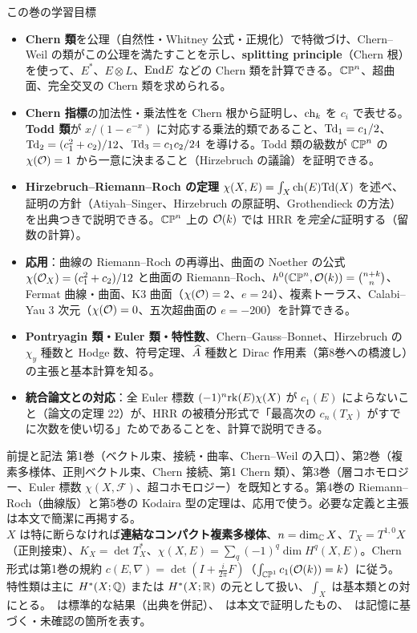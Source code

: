 \begin{goalbox}{この巻の学習目標}
\begin{itemize}
\item \textbf{Chern 類}を公理（自然性・Whitney 公式・正規化）で特徴づけ、Chern--Weil の類がこの公理を満たすことを示し、\textbf{splitting principle}（Chern 根）を使って、$E^*$、$E\otimes L$、$\mathrm{End} E$ などの Chern 類を計算できる。$\mathbb{CP}^n$、超曲面、完全交叉の Chern 類を求められる。
\item \textbf{Chern 指標}の加法性・乗法性を Chern 根から証明し、$\mathrm{ch}_k$ を $c_i$ で表せる。\textbf{Todd 類}が $x/(1-e^{-x})$ に対応する乗法的類であること、$\mathrm{Td}_1=c_1/2$、$\mathrm{Td}_2=(c_1^2+c_2)/12$、$\mathrm{Td}_3=c_1c_2/24$ を導ける。Todd 類の級数が $\mathbb{CP}^n$ の $\chi(\mathcal O)=1$ から一意に決まること（Hirzebruch の議論）を証明できる。
\item \textbf{Hirzebruch--Riemann--Roch の定理} $\chi(X,E)=\int_X\mathrm{ch}(E)\mathrm{Td}(X)$ を述べ、証明の方針（Atiyah--Singer、Hirzebruch の原証明、Grothendieck の方法）を出典つきで説明できる。$\mathbb{CP}^n$ 上の $\mathcal O(k)$ では HRR を\emph{完全に}証明する（留数の計算）。
\item \textbf{応用}：曲線の Riemann--Roch の再導出、曲面の Noether の公式 $\chi(\mathcal O_X)=(c_1^2+c_2)/12$ と曲面の Riemann--Roch、$h^0(\mathbb{CP}^n,\mathcal O(k))=\binom{n+k}{n}$、Fermat 曲線・曲面、K3 曲面（$\chi(\mathcal O)=2$、$e=24$）、複素トーラス、Calabi--Yau 3 次元（$\chi(\mathcal O)=0$、五次超曲面の $e=-200$）を計算できる。
\item \textbf{Pontryagin 類・Euler 類・特性数}、Chern--Gauss--Bonnet、Hirzebruch の $\chi_y$ 種数と Hodge 数、符号定理、$\widehat{A}$ 種数と Dirac 作用素（第8巻への橋渡し）の主張と基本計算を知る。
\item \textbf{統合論文との対応}：全 Euler 標数 $(-1)^n\mathrm{rk}(E)\chi(X)$ が $c_1(E)$ によらないこと（論文の定理 22）が、HRR の被積分形式で「最高次の $c_n(T_X)$ がすでに次数を使い切る」ためであることを、計算で説明できる。
\end{itemize}
\end{goalbox}
\begin{goalbox}{前提と記法}
第1巻（ベクトル束、接続・曲率、Chern--Weil の入口）、第2巻（複素多様体、正則ベクトル束、Chern 接続、第1 Chern 類）、第3巻（層コホモロジー、Euler 標数 $\chi(X,\mathcal F)$、超コホモロジー）を既知とする。第4巻の Riemann--Roch（曲線版）と第5巻の Kodaira 型の定理は、応用で使う。必要な定義と主張は本文で簡潔に再掲する。\\
$X$ は特に断らなければ\textbf{連結なコンパクト複素多様体}、$n=\dim_{\mathbb C}X$、$T_X=T^{1,0}X$（正則接束）、$K_X=\det T_X^*$、$\chi(X,E)=\sum_q(-1)^q\dim H^q(X,E)$。Chern 形式は第1巻の規約 $c(E,\nabla)=\det(I+\tfrac{i}{2\pi}F)$（$\int_{\mathbb{CP}^1}c_1(\mathcal O(k))=k$）に従う。特性類は主に $H^*(X;\mathbb Q)$ または $H^*(X;\mathbb R)$ の元として扱い、$\int_X$ は基本類との対にとる。\tC\ は標準的な結果（出典を併記）、\tP\ は本文で証明したもの、\tQ\ は記憶に基づく・未確認の箇所を表す。
\end{goalbox}
\tableofcontents
\newpage
